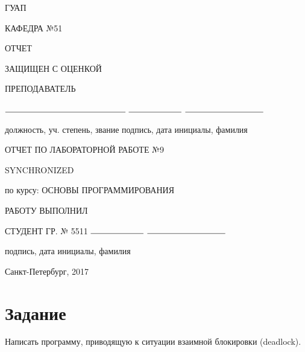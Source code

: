 \documentclass{article}
\begin{document}
\begin{titlepage}
	\begin{center}
    	ГУАП
    	\vspace{0.25cm}

    	КАФЕДРА №51
	\end{center}

    \begin{flushleft}

    	ОТЧЕТ

    	ЗАЩИЩЕН С ОЦЕНКОЙ

		ПРЕПОДАВАТЕЛЬ


    	\vspace{0.5cm}

		$\rule{5cm}{0.15mm}$ \hfill $\rule{2.2cm}{0.15mm}$  \hfill $\rule{3.25cm}{0.15mm}$

		должность, уч. степень, звание \hfill подпись, дата \hfill инициалы, фамилия
    \end{flushleft}

 	
    \hspace{2cm}

	\begin{center}
    	ОТЧЕТ ПО ЛАБОРАТОРНОЙ РАБОТЕ №9


    	\vspace{1cm}

    	SYNCHRONIZED


    	\vspace{1cm}

    	по курсу: ОСНОВЫ ПРОГРАММИРОВАНИЯ {\MakeUppercase{}}
    \end{center}

    \vspace{3cm}

    \begin{flushleft}
    	РАБОТУ ВЫПОЛНИЛ

    	СТУДЕНТ ГР. № 5511 \hfill $\rule{2.2cm}{0.15mm}$  \hfill $\rule{3.25cm}{0.15mm}$

    	\hspace{7.8cm} подпись, дата \hfill инициалы, фамилия
    \end{flushleft}

	\vspace{5cm}
	\begin{center}
 		Санкт-Петербург, 2017
	\end{center}
\end{titlepage}

\section{Задание}
Написать программу, приводящую к ситуации взаимной блокировки (deadlock).
\end{document}
